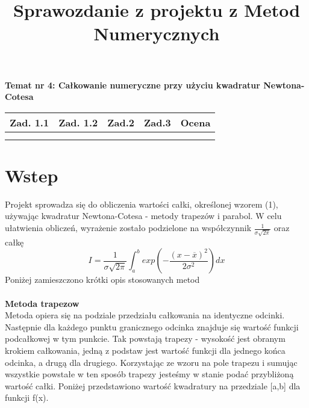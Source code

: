 \documentclass{article}
\title{Sprawozdanie z projektu z Metod Numerycznych}
\begin{document}
		\maketitle	
	\pagestyle{fancy}

	
	\textbf{Temat nr 4: Całkowanie numeryczne przy użyciu kwadratur Newtona-Cotesa}\\
	\begin{center}
		
		\begin{tabular}{|c|c|c|c|c|}
			\hline
			Zad. 1.1 & Zad. 1.2 &  Zad.2 & Zad.3 & Ocena\\\hline
			 & & & & \\
			 & & & & \\\hline
		\end{tabular}

	\end{center}
	\section{Wstep}
	Projekt sprowadza się do obliczenia wartości całki, określonej wzorem (1), używając kwadratur Newtona-Cotesa - metody trapezów i parabol. W celu ułatwienia obliczeń, wyrażenie zostało podzielone na współczynnik $\frac{1}{\sigma\sqrt{2\pi}}$ oraz całkę
		\begin{equation}
			I = \frac{1}{\sigma\sqrt{2\pi}}  \int_{a}^{b} exp  \left( - \frac{(x-\overline{x})^2}{2\sigma^2}   \right) dx
		\end{equation}
		Poniżej zamieszczono krótki opis stosowanych metod
		\\\\
		\textbf {Metoda trapezow }
		\\ 
		Metoda opiera się na podziale przedziału całkowania na identyczne odcinki. Następnie dla każdego punktu granicznego odcinka znajduje się wartość funkcji podcałkowej w tym punkcie. Tak powstają trapezy - wysokość jest obranym krokiem całkowania, jedną z podstaw jest wartość funkcji dla jednego końca odcinka, a drugą dla drugiego. Korzystając ze wzoru na pole trapezu i sumując wszystkie powstałe w ten sposób trapezy jesteśmy w stanie podać przybliżoną wartość całki. Poniżej przedstawiono wartość kwadratury na przedziale [a,b] dla funkcji f(x).
		
\end{document}
